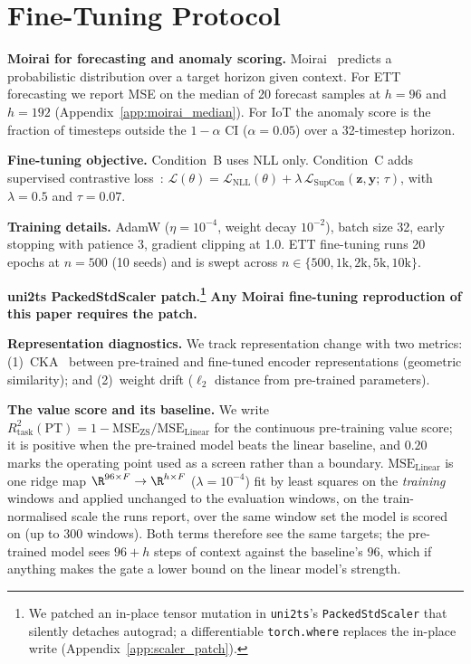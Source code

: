 \section{Fine-Tuning Protocol}
\label{sec:method}

\textbf{Moirai for forecasting and anomaly scoring.}
Moirai~\cite{woo2024moirai} predicts a probabilistic distribution
over a target horizon given context.  For ETT forecasting we report
MSE on the median of 20 forecast samples at $h{=}96$ and $h{=}192$
(Appendix~\ref{app:moirai_median}).  For IoT the anomaly score is
the fraction of timesteps outside the $1{-}\alpha$ CI
($\alpha{=}0.05$) over a 32-timestep horizon.

\textbf{Fine-tuning objective.}
Condition~B uses NLL only.  Condition~C adds supervised
contrastive loss~\cite{khosla2020supcon}:
$\mathcal{L}(\theta) = \mathcal{L}_{\text{NLL}}(\theta) +
\lambda\,\mathcal{L}_{\text{SupCon}}(\mathbf{z}, \mathbf{y};\, \tau)$,
with $\lambda = 0.5$ and $\tau = 0.07$.

\textbf{Training details.}
AdamW ($\eta = 10^{-4}$, weight decay $10^{-2}$), batch size 32,
early stopping with patience 3, gradient clipping at 1.0.  ETT
fine-tuning runs 20 epochs at $n{=}500$ (10 seeds) and is swept
across $n{\in}\{500,1{\text{k}},2{\text{k}},5{\text{k}},10{\text{k}}\}$.

\textbf{uni2ts PackedStdScaler patch.\footnote{We patched an in-place
tensor mutation in \texttt{uni2ts}'s \texttt{PackedStdScaler} that
silently detaches autograd; a differentiable \texttt{torch.where}
replaces the in-place write (Appendix~\ref{app:scaler_patch}).}}
\textbf{Any Moirai fine-tuning reproduction of this paper requires the patch.}

\textbf{Representation diagnostics.}
We track representation change with two metrics:
(1)~CKA~\cite{kornblith2019cka} between pre-trained and fine-tuned
encoder representations (geometric similarity);
and (2)~weight drift ($\ell_2$ distance from pre-trained parameters).

\textbf{The value score and its baseline.}
We write $R^2_\text{task}(\text{PT}) = 1-\text{MSE}_\text{ZS}/\text{MSE}_\text{Linear}$
for the continuous pre-training value score; it is positive when the
pre-trained model beats the linear baseline, and $0.20$ marks the operating
point used as a screen rather than a boundary.
$\text{MSE}_\text{Linear}$ is one ridge map $\R^{96 \times F} \to \R^{h \times F}$
($\lambda{=}10^{-4}$) fit by least squares on the \emph{training} windows and
applied unchanged to the evaluation windows, on the train-normalised scale the
runs report, over the same window set the model is scored on (up to 300
windows). Both terms therefore see the same targets; the pre-trained model sees
$96{+}h$ steps of context against the baseline's $96$, which if anything makes
the gate a lower bound on the linear model's strength.

